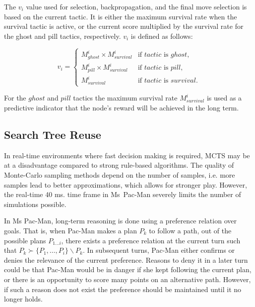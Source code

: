 \documentclass[journal]{IEEEtran}
\begin{document}
The $v_i$ value used for selection, backpropagation, and the final move selection is based on the current tactic. It is either the maximum survival rate when the survival tactic is active, or the current score multiplied by the survival rate for the ghost and pill tactics, respectively.
$v_i$ is defined as follows:

\begin{equation}
v_i =
\begin{cases}
   {M}^i_{ghost} \times {M}^i_{survival} & \text{if $tactic$ is $ghost$}, \\
   {M}^i_{pill} \times {M}^i_{survival} & \text{if $tactic$ is $pill$}, \\
   {M}^i_{survival} & \text{if $tactic$ is $survival$}.
\end{cases}
\label{eq:vi}
\end{equation}

For the $ghost$ and $pill$ tactics the maximum survival rate ${M}^i_{survival}$ is used as a predictive indicator that the node's reward will be achieved in the long term.


\subsection{Search Tree Reuse}
\label{reuse}
In real-time environments where fast decision making is required, MCTS may be at a disadvantage compared to strong rule-based algorithms. The quality of Monte-Carlo sampling methods depend on the number of samples, i.e. more samples lead to better approximations, which allows for stronger play. However, the real-time 40 ms. time frame in Ms~Pac-Man severely limits the number of simulations possible. 

In Ms Pac-Man, long-term reasoning is done using a preference relation over goals. That is, when Pac-Man makes a plan $P_k$ to follow a path, out of the possible plans $P_{1 \ldots i}$, there exists a preference relation at the current turn such that $P_k \succ \{P_1, \ldots, P_i\} \backslash P_k$. In subsequent turns, Pac-Man either confirms or denies the relevance of the current preference. Reasons to deny it in a later turn could be that Pac-Man would be in danger if she kept following the current plan, or there is an opportunity to score many points on an alternative path. However, if such a reason does not exist the preference should be maintained until it no longer holds.
\end{document}
